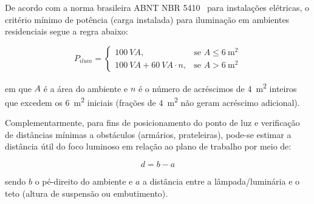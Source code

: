 \documentclass[12pt,openright,oneside,a4paper,brazil]{abntex2}
\begin{document}
De acordo com a norma brasileira ABNT NBR 5410~\cite{nbr5410} para instalações elétricas, o critério mínimo de potência (carga instalada) para iluminação em ambientes residenciais segue a regra abaixo:

\begin{equation}
    P_{ilum} =
    \begin{cases}
        \SI{100}{VA}, & \text{se } A \le \SI{6}{\meter\squared} \\[4pt]
        \SI{100}{VA} + \SI{60}{VA}\cdot n, & \text{se } A > \SI{6}{\meter\squared}
    \end{cases}
    \label{eq:iluminacao}
\end{equation} \vspace{0.05cm}

em que $A$ é a área do ambiente e $n$ é o número de acréscimos de
\SI{4}{\meter\squared} {inteiros} que excedem os \SI{6}{\meter\squared}
iniciais (frações de \SI{4}{\meter\squared} não geram acréscimo adicional).

Complementarmente, para fins de posicionamento do ponto de luz e verificação
de distâncias mínimas a obstáculos (armários, prateleiras), pode-se estimar
a distância útil do foco luminoso em relação ao plano de trabalho por meio
de:

\begin{equation}
    d = b - a
    \label{eq:distancia_foco}
\end{equation}

sendo $b$ o pé-direito do ambiente e $a$ a distância entre a lâmpada/luminária
e o teto (altura de suspensão ou embutimento).
\end{document}
